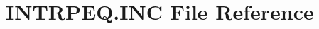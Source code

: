 \hypertarget{INTRPEQ_8INC}{}\section{I\+N\+T\+R\+P\+E\+Q.\+I\+NC File Reference}
\label{INTRPEQ_8INC}
